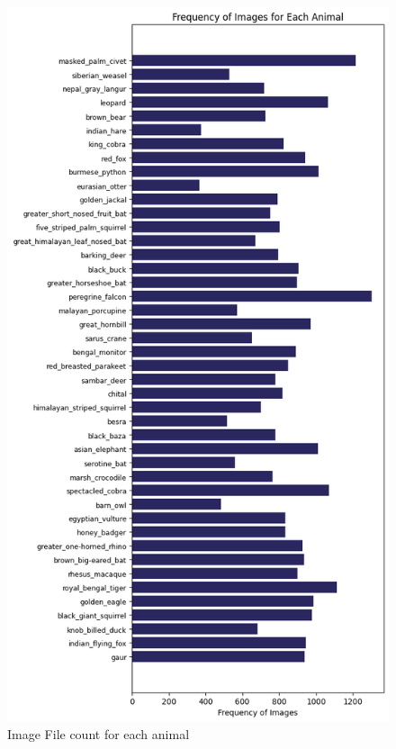 \documentclass[fleqn, 10pt, twoside]{IOEGC}
\begin{document}
\begin{figure}
	\centering
	\includegraphics[scale=0.5]{Graphics/naturalist_horizontal.png}
	\caption{Image File count for each animal}
	\label{image-file-count-animal}
\end{figure}
\end{document}
